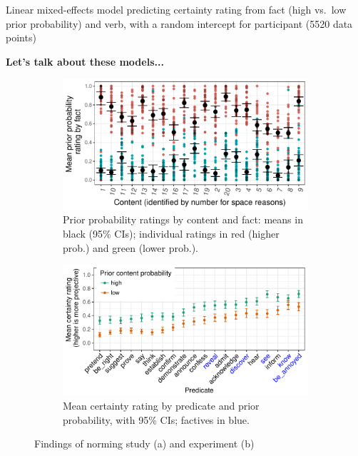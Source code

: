 \documentclass[12pt,fleqn]{article}
\newcommand{\6}{\mbox{$[\hspace*{-.6mm}[$}}
\newcommand{\9}{\mbox{$]\hspace*{-.6mm}]$}}
\begin{document}
Linear mixed-effects model predicting certainty rating from fact (high vs.\ low prior probability) and verb, with a random intercept for participant (5520 data points)

{\bf Let's talk about these models...}

\begin{figure}[h!]

\begin{subfigure}{.47\textwidth}
\centering
\includegraphics[width=.35\paperwidth]{../results/1-prior/graphs/target-ratings}
\caption{Prior probability ratings by content and fact: means in black (95\% CIs); individual ratings in red (higher prob.) and green (lower prob.).}\label{f-prior}
\end{subfigure}%
\hspace*{.1cm}
\begin{subfigure}{.47\textwidth}
\centering
\includegraphics[width=.4\paperwidth]{../results/3-projectivity/graphs/means-projectivity-by-predicate-and-facttype}
\caption{Mean certainty rating by predicate and prior probability, with 95\% CIs; factives in blue.}\label{f-proj}
\end{subfigure}

\caption{Findings of norming study (a) and experiment (b)}
\end{figure}
\end{document}
